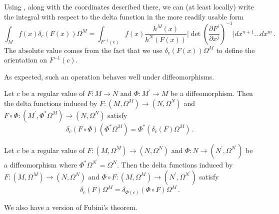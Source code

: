 Using , along with the coordinates described there, we can (at least locally) write the integral with respect to the delta function in the more readily usable form
\begin{equation}\label{delta_integral_coords}
\int_M f(x)\delta_c(F(x))\Omega^M=\int_{F^{-1}(c)} f(x)\frac{h^M(x)}{h^N(F(x))}\bigg|\det \left(\frac{\partial F^i}{\partial x^j}\right)^{-1}\bigg|dx^{n+1}...dx^m\,.
\end{equation}
The absolute value comes from the fact that we use $\delta_c(F(x))\Omega^M$ to define the orientation on $F^{-1}(c)$.


As expected, such an operation behaves well under diffeomorphisms.
\begin{lemma}\label{diffeo_property}
Let $c$ be a regular value of $F:M\rightarrow N$ and $\Phi:M^{'}\rightarrow M$ be a diffeomorphism.  Then the delta functions induced by $F:(M,\Omega^M)\rightarrow (N,\Omega^N)$ and $F\circ\Phi:(M^{'},\Phi^*\Omega^M)\rightarrow  (N,\Omega^N)$ satisfy
\begin{equation}
\delta_c(F\circ\Phi)(\Phi^*\Omega^M)=\Phi^*(\delta_c(F)\Omega^M)\,.
\end{equation}
\end{lemma}

\begin{lemma}
Let $c$ be a regular value of $F:(M,\Omega^M)\rightarrow (N,\Omega^N)$ and $\Phi:N\rightarrow (N^{'},\Omega^{N^{'}})$ be a diffeomorphism where $\Phi^*\Omega^{N^{'}}=\Omega^N$.  Then the delta functions induced by $F:(M,\Omega^M)\rightarrow (N,\Omega^N)$ and $\Phi\circ F:(M,\Omega^M)\rightarrow (N^{'},\Omega^{N^{'}})$ satisfy
\begin{equation}
\delta_c(F)\Omega^M=\delta_{\Phi(c)}(\Phi\circ F)\Omega^M\,.
\end{equation}
\end{lemma}

We also have a version of Fubini's theorem.

